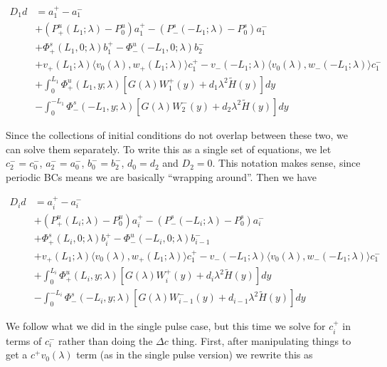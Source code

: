 \documentclass[12pt]{article}
\begin{document}
\begin{enumerate}
\begin{align*}
D_1 d &= a_1^+ - a_1^- \\
&+ (P^u_+(L_1; \lambda) - P_0^u)a_1^+ - (P^s_-(-L_1; \lambda) - P_0^s)a_1^- \\
&+ \Phi^s_+(L_1, 0; \lambda)b_1^+ - \Phi^u_-(-L_1, 0; \lambda)b_2^- \\
&+ v_+(L_1; \lambda) \langle v_0(\lambda), w_+(L_1; \lambda) \rangle c_1^+ - v_-(-L_1; \lambda) \langle v_0(\lambda), w_-(-L_1; \lambda) \rangle c_1^- \\
&+ \int_0^{L_1} \Phi^u_+(L_1, y; \lambda) [ G(\lambda)W_1^+(y) + d_1 \lambda^2 \tilde{H}(y) ] dy \\
&- \int_0^{-L_1} \Phi^s_-(-L_1, y; \lambda) [ G(\lambda)W_2^-(y) + d_2 \lambda^2 \tilde{H}(y) ] dy
\end{align*}

Since the collections of initial conditions do not overlap between these two, we can solve them separately. To write this as a single set of equations, we let $c_2^- = c_0^-$, $a_2^- = a_0^-$, $b_0^- = b_2^-$, $d_0 = d_2$ and $D_2 = 0$. This notation makes sense, since periodic BCs means we are basically ``wrapping around''. Then we have


\begin{align*}
D_i d &= a_i^+ - a_i^- \\
&+ (P^u_+(L_i; \lambda) - P_0^u)a_i^+ - (P^s_-(-L_i; \lambda) - P_0^s)a_i^- \\
&+ \Phi^s_+(L_i, 0; \lambda)b_i^+ - \Phi^u_-(-L_i, 0; \lambda)b_{i-1}^- \\
&+ v_+(L_1; \lambda) \langle v_0(\lambda), w_+(L_1; \lambda) \rangle c_1^+ - v_-(-L_1; \lambda) \langle v_0(\lambda), w_-(-L_1; \lambda) \rangle c_1^- \\
&+ \int_0^{L_i} \Phi^u_+(L_i, y; \lambda) [ G(\lambda)W_i^+(y) + d_i \lambda^2 \tilde{H}(y) ] dy \\
&- \int_0^{-L_i} \Phi^s_-(-L_i, y; \lambda) [ G(\lambda)W_{i-1}^-(y) + d_{i-1} \lambda^2 \tilde{H}(y) ] dy
\end{align*}

We follow what we did in the single pulse case, but this time we solve for $c_i^+$ in terms of $c_i^-$ rather than doing the $\Delta c$ thing. First, after manipulating things to get a $c^+ v_0(\lambda)$ term (as in the single pulse version) we rewrite this as


\end{enumerate}
\end{document}
